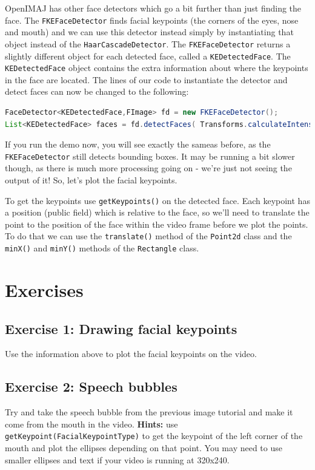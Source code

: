 \documentclass[10pt,a4paper,twoside,extrafontsizes]{memoir}
\begin{document}
OpenIMAJ has other face detectors which go a bit further than just finding the face. 
The \verb+FKEFaceDetector+ finds facial keypoints (the corners of the eyes, nose and mouth) 
and we can use this detector instead simply by instantiating that object instead of the 
\verb+HaarCascadeDetector+. The \verb+FKEFaceDetector+ returns a slightly different object 
for each detected face, called a \verb+KEDetectedFace+. The \verb+KEDetectedFace+ object 
contains the extra information about where the keypoints in the face are located. 
The lines of our code to instantiate the detector and detect faces can now be changed to 
the following:
\begin{lstlisting}[language=java]
FaceDetector<KEDetectedFace,FImage> fd = new FKEFaceDetector();
List<KEDetectedFace> faces = fd.detectFaces( Transforms.calculateIntensity( frame ) );
\end{lstlisting}
If you run the demo now, you will see exactly the sameas before, as the \verb+FKEFaceDetector+ 
still detects bounding boxes. It may be running a bit slower though, as there is much more 
processing going on - we're just not seeing the output of it! So, let's plot the facial keypoints.

To get the keypoints use \verb+getKeypoints()+ on the detected face. Each keypoint has a 
position (public field) which is relative to the face, so we'll need to translate the 
point to the position of the face within the video frame before we plot the points. 
To do that we can use the \verb+translate()+ method of the \verb+Point2d+ class
and the \verb+minX()+ and \verb+minY()+ methods of the \verb+Rectangle+ class.

\section*{Exercises}
\subsection*{Exercise 1: Drawing facial keypoints}
Use the information above to plot the facial keypoints on the video.

\subsection*{Exercise 2: Speech bubbles}
Try and take the speech bubble from the previous image tutorial and make it come from the mouth 
in the video. \textbf{Hints:} use \verb+getKeypoint(FacialKeypointType)+ to get the keypoint 
of the left corner of the mouth and plot the ellipses depending on that point. You may need to 
use smaller ellipses and text if your video is running at 320x240.
\end{document}
